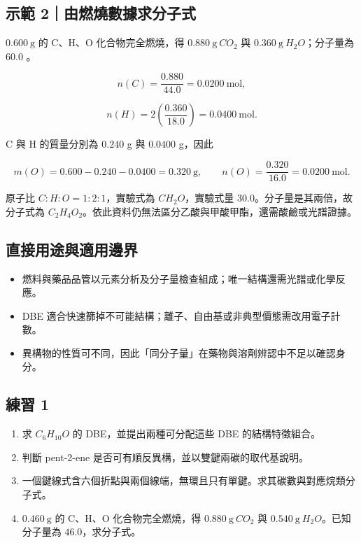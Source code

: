 \documentclass[11pt,a4paper]{article}
\providecommand{\tightlist}{%
  \setlength{\itemsep}{0pt}\setlength{\parskip}{0pt}}
\begin{document}
\begin{HandoutWorkedExample}

\subsection{示範 2｜由燃燒數據求分子式}\label{ux793aux7bc4-2ux7531ux71c3ux71d2ux6578ux64daux6c42ux5206ux5b50ux5f0f}

\(0.600\ \mathrm g\) 的 C、H、O 化合物完全燃燒，得 \(0.880\ \mathrm g\ CO_2\) 與 \(0.360\ \mathrm g\ H_2O\)；分子量為 \(60.0\) 。

\[
n(C)=\frac{0.880}{44.0}=0.0200\ \mathrm{mol},
\]

\[
n(H)=2\left(\frac{0.360}{18.0}\right)=0.0400\ \mathrm{mol}.
\]

C 與 H 的質量分別為 \(0.240\) g 與 \(0.0400\) g，因此

\[
m(O)=0.600-0.240-0.0400=0.320\ \mathrm g,
\qquad n(O)=\frac{0.320}{16.0}=0.0200\ \mathrm{mol}.
\]

原子比 \(C:H:O=1:2:1\)，實驗式為 \(CH_2O\)，實驗式量 \(30.0\)。分子量是其兩倍，故分子式為 \(C_2H_4O_2\)。依此資料仍無法區分乙酸與甲酸甲酯，還需酸鹼或光譜證據。

\end{HandoutWorkedExample}

\subsection{直接用途與適用邊界}\label{ux76f4ux63a5ux7528ux9014ux8207ux9069ux7528ux908aux754c}

\begin{itemize}
\tightlist
\item
  燃料與藥品品管以元素分析及分子量檢查組成；唯一結構還需光譜或化學反應。
\item
  DBE 適合快速篩掉不可能結構；離子、自由基或非典型價態需改用電子計數。
\item
  異構物的性質可不同，因此「同分子量」在藥物與溶劑辨認中不足以確認身分。
\end{itemize}

\subsection{練習 1}\label{ux7df4ux7fd2-1}

\begin{enumerate}
\def\labelenumi{\arabic{enumi}.}
\tightlist
\item
  求 \(C_6H_{10}O\) 的 DBE，並提出兩種可分配這些 DBE 的結構特徵組合。
\item
  判斷 pent-2-ene 是否可有順反異構，並以雙鍵兩碳的取代基說明。
\item
  一個鍵線式含六個折點與兩個線端，無環且只有單鍵。求其碳數與對應烷類分子式。
\item
  \(0.460\ \mathrm g\) 的 C、H、O 化合物完全燃燒，得 \(0.880\ \mathrm g\ CO_2\) 與 \(0.540\ \mathrm g\ H_2O\)。已知分子量為 \(46.0\)，求分子式。
\end{enumerate}
\end{document}
